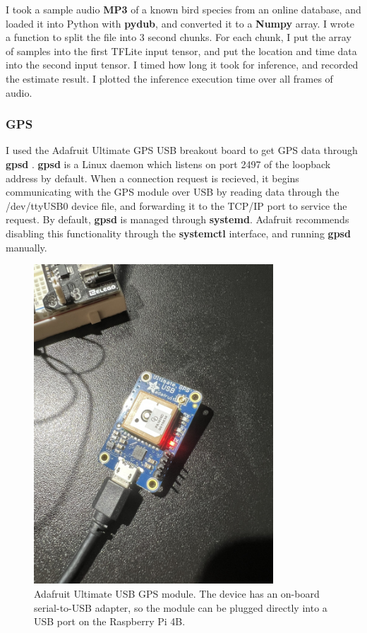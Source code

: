 \documentclass[12pt]{article}
\begin{document}
	I took a sample audio \textbf{MP3} of a known bird species from an online database, and loaded it into Python with \textbf{pydub}, and converted it to a \textbf{Numpy} array. I wrote a function to split the file into 3 second chunks. For each chunk, I put the array of samples into the first TFLite input tensor, and put the location and time data into the second input tensor. I timed how long it took for inference, and recorded the estimate result. I plotted the inference execution time over all frames of audio.
	
\subsubsection{GPS}
	
	I used the Adafruit Ultimate GPS USB breakout board to get GPS data through \textbf{gpsd} \cite{townsend2023}. \textbf{gpsd} is a Linux daemon which listens on port 2497 of the loopback address by default. When a connection request is recieved, it begins communicating with the GPS module over USB by reading data through the /dev/ttyUSB0 device file, and forwarding it to the TCP/IP port to service the request. By default, \textbf{gpsd} is managed through \textbf{systemd}. Adafruit recommends disabling this functionality through the \textbf{systemctl} interface, and running \textbf{gpsd} manually.

\begin{figure}[h]
\centering
\includegraphics[width=0.8\textwidth]{gps_hardware.jpg} %
\caption{Adafruit Ultimate USB GPS module. The device has an on-board serial-to-USB adapter, so the module can be plugged directly into a USB port on the Raspberry Pi 4B.}
\label{fig:gps_hardware}
\end{figure}
	
\end{document}
